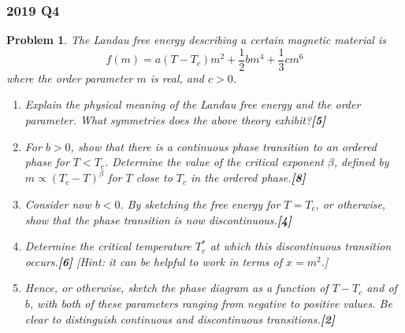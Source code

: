 \documentclass[a4paper]{article}
\theoremstyle{new}
\newtheorem{qns}{Problem}[section]
\begin{document}
\subsubsection*{2019 Q4}
\begin{qns}
The Landau free energy describing a certain magnetic material is
$$f(m)=a(T-T_c)m^2+\frac{1}{2}bm^4+\frac{1}{3}cm^6$$
where the order parameter $m$ is real, and $c > 0$.
\begin{enumerate}[label=(\alph*)]
\item Explain the physical meaning of the Landau free energy and the order parameter. What symmetries does the above theory exhibit?\hfill\textbf{[5]}
\item For $b > 0$, show that there is a continuous phase transition to an ordered phase for $T < T_c$. Determine the value of the critical exponent $\beta$, defined by $m\propto(T_c-T)^\beta$ for $T$ close to $T_c$ in the ordered phase.\hfill\textbf{[8]}
\item Consider now $b < 0$. By sketching the free energy for $T = T_c$, or otherwise, show that the phase transition is now discontinuous.\hfill\textbf{[4]}
\item Determine the critical temperature $T^*_c$ at which this discontinuous transition occurs.\hfill\textbf{[6]}
[Hint: it can be helpful to work in terms of $x=m^2$.]
\item Hence, or otherwise, sketch the phase diagram as a function of $T − T_c$ and of $b$, with both of these parameters ranging from negative to positive values. Be clear to distinguish continuous and discontinuous transitions.\hfill\textbf{[2]}
\end{enumerate}
\end{qns}
\end{document}
